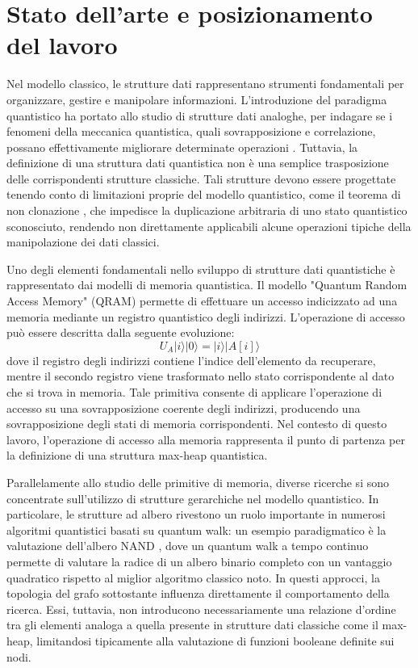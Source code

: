 \section{Stato dell'arte e posizionamento del lavoro \label{sec:stato-arte}}
Nel modello classico, le strutture dati rappresentano strumenti fondamentali per organizzare, gestire e manipolare informazioni. L'introduzione del paradigma quantistico ha portato allo studio di strutture dati analoghe, per indagare se i fenomeni della meccanica quantistica, quali sovrapposizione e correlazione, possano effettivamente migliorare determinate operazioni \cite{littau2024quantumdatastructures}. Tuttavia, la definizione di una struttura dati quantistica non è una semplice trasposizione delle corrispondenti strutture classiche. Tali strutture devono essere progettate tenendo conto di limitazioni proprie del modello quantistico, come il teorema di non clonazione \cite{Nielsen_Chuang_2010}, che impedisce la duplicazione arbitraria di uno stato quantistico sconosciuto, rendendo non direttamente applicabili alcune operazioni tipiche della manipolazione dei dati classici.

Uno degli elementi fondamentali nello sviluppo di strutture dati quantistiche è rappresentato dai modelli di memoria quantistica. Il modello "Quantum Random Access Memory" (QRAM) \cite{giovannetti2008qram, giovannetti2008architectures} permette di effettuare un accesso indicizzato ad una memoria mediante un registro quantistico degli indirizzi. L'operazione di accesso può essere descritta dalla seguente evoluzione:
\begin{equation}
  U_A |i\rangle |0\rangle = |i\rangle |A[i]\rangle
\end{equation}
dove il registro degli indirizzi contiene l'indice dell'elemento da recuperare, mentre il secondo registro viene trasformato nello stato corrispondente al dato che si trova in memoria. Tale primitiva consente di applicare l'operazione di accesso su una sovrapposizione coerente degli indirizzi, producendo una sovrapposizione degli stati di memoria corrispondenti. Nel contesto di questo lavoro, l'operazione di accesso alla memoria rappresenta il punto di partenza per la definizione di una struttura max-heap quantistica.

Parallelamente allo studio delle primitive di memoria, diverse ricerche si sono concentrate sull'utilizzo di strutture gerarchiche nel modello quantistico. In particolare, le strutture ad albero rivestono un ruolo importante in numerosi algoritmi quantistici basati su quantum walk: un esempio paradigmatico è la valutazione dell'albero NAND \cite{farhi2008nandtree}, dove un quantum walk a tempo continuo permette di valutare la radice di un albero binario completo con un vantaggio quadratico rispetto al miglior algoritmo classico noto. In questi approcci, la topologia del grafo sottostante influenza direttamente il comportamento della ricerca. Essi, tuttavia, non introducono necessariamente una relazione d'ordine tra gli elementi analoga a quella presente in strutture dati classiche come il max-heap, limitandosi tipicamente alla valutazione di funzioni booleane definite sui nodi.

